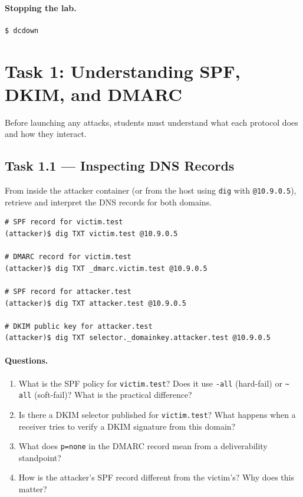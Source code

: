 \documentclass[11pt]{article}
\begin{document}
\paragraph{Stopping the lab.}
\begin{listing}[H]
\begin{verbatim}
$ dcdown
\end{verbatim}    

\end{listing}

\section{Task 1: Understanding SPF, DKIM, and DMARC}

Before launching any attacks, students must understand what each
protocol does and how they interact.

\subsection{Task 1.1 --- Inspecting DNS Records}

From inside the attacker container (or from the host using
\texttt{dig} with \texttt{@10.9.0.5}), retrieve and interpret the
DNS records for both domains.

\begin{listing}[H]
\begin{verbatim}
# SPF record for victim.test
(attacker)$ dig TXT victim.test @10.9.0.5

# DMARC record for victim.test
(attacker)$ dig TXT _dmarc.victim.test @10.9.0.5

# SPF record for attacker.test
(attacker)$ dig TXT attacker.test @10.9.0.5

# DKIM public key for attacker.test
(attacker)$ dig TXT selector._domainkey.attacker.test @10.9.0.5
\end{verbatim}
\end{listing}

\paragraph{Questions.}
\begin{enumerate}[noitemsep]
  \item What is the SPF policy for \texttt{victim.test}?
    Does it use \texttt{-all} (hard-fail) or \texttt{\textasciitilde
    all} (soft-fail)?
    What is the practical difference?
  \item Is there a DKIM selector published for \texttt{victim.test}?
    What happens when a receiver tries to verify a DKIM signature from
    this domain?
  \item What does \texttt{p=none} in the DMARC record mean from a
    deliverability standpoint?
  \item How is the attacker's SPF record different from the victim's?
    Why does this matter?
\end{enumerate}
\end{document}
